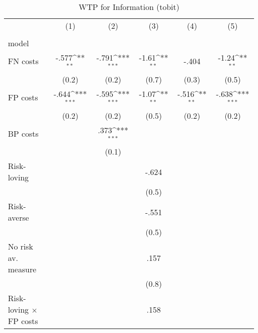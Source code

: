 \begin{table}[htbp]\centering
\def\sym#1{\ifmmode^{#1}\else\(^{#1}\)\fi}
\caption{WTP for Information (tobit)}
\begin{tabular}{l*{5}{c}}
\hline\hline
                &\multicolumn{1}{c}{(1)}&\multicolumn{1}{c}{(2)}&\multicolumn{1}{c}{(3)}&\multicolumn{1}{c}{(4)}&\multicolumn{1}{c}{(5)}\\
                &\multicolumn{1}{c}{}&\multicolumn{1}{c}{}&\multicolumn{1}{c}{}&\multicolumn{1}{c}{}&\multicolumn{1}{c}{}\\
\hline
model           &                  &                  &                  &                  &                  \\
FN costs        &    -.577\sym{**} &    -.791\sym{***}&    -1.61\sym{**} &    -.404         &    -1.24\sym{**} \\
                &    (0.2)         &    (0.2)         &    (0.7)         &    (0.3)         &    (0.5)         \\
FP costs        &    -.644\sym{***}&    -.595\sym{***}&    -1.07\sym{**} &    -.516\sym{**} &    -.638\sym{***}\\
                &    (0.2)         &    (0.2)         &    (0.5)         &    (0.2)         &    (0.2)         \\
BP costs        &                  &     .373\sym{***}&                  &                  &                  \\
                &                  &    (0.1)         &                  &                  &                  \\
Risk-loving     &                  &                  &    -.624         &                  &                  \\
                &                  &                  &    (0.5)         &                  &                  \\
Risk-averse     &                  &                  &    -.551         &                  &                  \\
                &                  &                  &    (0.5)         &                  &                  \\
No risk av. measure&                  &                  &     .157         &                  &                  \\
                &                  &                  &    (0.8)         &                  &                  \\
Risk-loving $\times$ FP costs&                  &                  &     .158         &                  &                  \\

\end{tabular}
\end{table}
